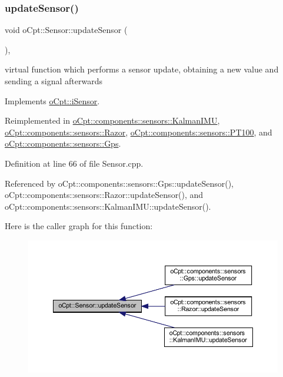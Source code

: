 \subsubsection{\texorpdfstring{update\+Sensor()}{updateSensor()}}
{\footnotesize\ttfamily void o\+Cpt\+::\+Sensor\+::update\+Sensor (\begin{DoxyParamCaption}{ }\end{DoxyParamCaption})\hspace{0.3cm}{\ttfamily [override]}, {\ttfamily [virtual]}}

virtual function which performs a sensor update, obtaining a new value and sending a signal afterwards 

Implements \hyperlink{classo_cpt_1_1i_sensor_aa55bc04979e4852989af2bd4f64e70bc}{o\+Cpt\+::i\+Sensor}.



Reimplemented in \hyperlink{classo_cpt_1_1components_1_1sensors_1_1_kalman_i_m_u_acc4f666db05d6355772a67ae2f06faef}{o\+Cpt\+::components\+::sensors\+::\+Kalman\+I\+MU}, \hyperlink{classo_cpt_1_1components_1_1sensors_1_1_razor_ac8ee1582eb5c478c73e5e050858d2d7d}{o\+Cpt\+::components\+::sensors\+::\+Razor}, \hyperlink{classo_cpt_1_1components_1_1sensors_1_1_p_t100_a66619675288a5344a55242d9bf097aee}{o\+Cpt\+::components\+::sensors\+::\+P\+T100}, and \hyperlink{classo_cpt_1_1components_1_1sensors_1_1_gps_a95976c5d8bba650d2732d4eb43979283}{o\+Cpt\+::components\+::sensors\+::\+Gps}.



Definition at line 66 of file Sensor.\+cpp.



Referenced by o\+Cpt\+::components\+::sensors\+::\+Gps\+::update\+Sensor(), o\+Cpt\+::components\+::sensors\+::\+Razor\+::update\+Sensor(), and o\+Cpt\+::components\+::sensors\+::\+Kalman\+I\+M\+U\+::update\+Sensor().

Here is the caller graph for this function\+:
\nopagebreak
\begin{figure}[H]
\begin{center}
\leavevmode
\includegraphics[width=350pt]{classo_cpt_1_1_sensor_ab4b0dedb06f11bcf2368852035beb2b2_icgraph}
\end{center}
\end{figure}


